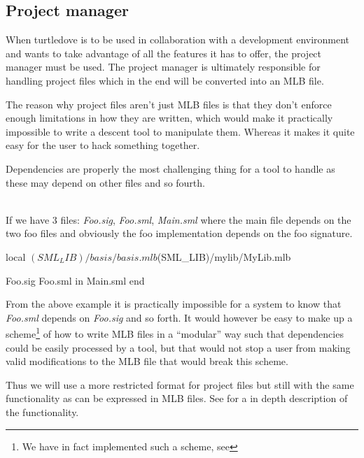 \subsection{Project manager}

When turtledove is to be used in collaboration with a development environment
and wants to take advantage of all the features it has to offer, the project
manager must be used. The project manager is ultimately responsible for handling
project files which in the end will be converted into an MLB file. 

The reason why project files aren't just MLB files is that they don't enforce
enough limitations in how they are written, which would make it practically
impossible to write a descent tool to manipulate them. Whereas it makes it quite
easy for the user to hack something together.

Dependencies are properly the most challenging thing for a tool to handle as
these may depend on other files and so fourth. 

\begin{example}\ \\
  If we have 3 files: \textit{Foo.sig}, \textit{Foo.sml}, \textit{Main.sml}
  where the main file depends on the two foo files and obviously the foo
  implementation depends on the foo signature. 

  \begin{sml}
local
  $(SML_LIB)/basis/basis.mlb
  $(SML_LIB)/mylib/MyLib.mlb

  Foo.sig Foo.sml
in
  Main.sml
end    
  \end{sml}
\end{example}

\noindent
From the above example it is practically impossible for a system to know that
\textit{Foo.sml} depends on \textit{Foo.sig} and so forth. It would however be
easy to make up a scheme\footnote{We have in fact implemented such a scheme, see
  } of how to write MLB files in a ``modular'' way such that
dependencies could be easily processed by a tool, but that would not stop a user
from making valid modifications to the MLB file that would break this scheme.


Thus we will use a more restricted format for project files but still with the
same functionality as can be expressed in MLB files. See
 for a in depth description of the
functionality.



